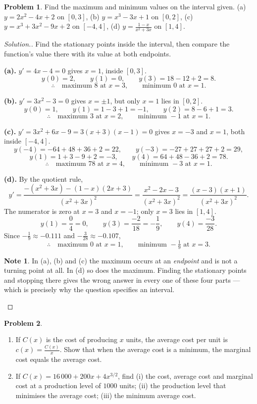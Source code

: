 \documentclass[11pt,a4paper]{article}
\theoremstyle{definition}
\newtheorem{note}[thm]{Note}
\newtheorem{problemx}{Problem}[section]
\newenvironment{problem}{\begin{problemx}}{\end{problemx}}
\newenvironment{solution}
  {\renewcommand{\qedsymbol}{}\begin{proof}[\textit{Solution}.]}
  {\end{proof}}
\begin{document}
\begin{problem}
Find the maximum and minimum values on the interval given.
\quad (a) $y=2x^2-4x+2$ on $[0,3]$, \quad (b) $y=x^3-3x+1$ on $[0,2]$, \quad
(c) $y=x^3+3x^2-9x+2$ on $[-4,4]$, \quad (d) $y=\frac{1-x}{x^2+3x}$ on $[1,4]$.
\end{problem}

\begin{solution}
Find the stationary points inside the interval, then compare the function's value there
with its value at both endpoints.

\textbf{(a).} $y'=4x-4=0$ gives $x=1$, inside $[0,3]$.
$$y(0)=2,\qquad y(1)=0,\qquad y(3)=18-12+2=8.$$
$$\therefore\quad \text{maximum } 8 \text{ at } x=3,\qquad
\text{minimum } 0 \text{ at } x=1.$$

\textbf{(b).} $y'=3x^2-3=0$ gives $x=\pm 1$, but only $x=1$ lies in $[0,2]$.
$$y(0)=1,\qquad y(1)=1-3+1=-1,\qquad y(2)=8-6+1=3.$$
$$\therefore\quad \text{maximum } 3 \text{ at } x=2,\qquad
\text{minimum } -1 \text{ at } x=1.$$

\textbf{(c).} $y'=3x^2+6x-9=3(x+3)(x-1)=0$ gives $x=-3$ and $x=1$, both inside
$[-4,4]$.
$$y(-4)=-64+48+36+2=22,\qquad y(-3)=-27+27+27+2=29,$$
$$y(1)=1+3-9+2=-3,\qquad y(4)=64+48-36+2=78.$$
$$\therefore\quad \text{maximum } 78 \text{ at } x=4,\qquad
\text{minimum } -3 \text{ at } x=1.$$

\textbf{(d).} By the quotient rule,
$$y'=\frac{-\left(x^2+3x\right)-(1-x)(2x+3)}{\left(x^2+3x\right)^2}
=\frac{x^2-2x-3}{\left(x^2+3x\right)^2}=\frac{(x-3)(x+1)}{\left(x^2+3x\right)^2}.$$
The numerator is zero at $x=3$ and $x=-1$; only $x=3$ lies in $[1,4]$.
$$y(1)=\frac{0}{4}=0,\qquad y(3)=\frac{-2}{18}=-\frac{1}{9},\qquad
y(4)=\frac{-3}{28}.$$
Since $-\frac{1}{9}\approx-0.111$ and $-\frac{3}{28}\approx-0.107$,
$$\therefore\quad \text{maximum } 0 \text{ at } x=1,\qquad
\text{minimum } -\tfrac{1}{9} \text{ at } x=3.$$

\begin{note}
In (a), (b) and (c) the maximum occurs at an \emph{endpoint} and is not a turning point
at all. In (d) so does the maximum. Finding the stationary points and stopping there
gives the wrong answer in every one of these four parts --- which is precisely why the
question specifies an interval.
\end{note}
\end{solution}

\begin{problem}
\begin{enumerate}
\item[(a).] If $C(x)$ is the cost of producing $x$ units, the average cost per unit is
$c(x)=\frac{C(x)}{x}$. Show that when the average cost is a minimum, the marginal cost
equals the average cost.
\item[(b).] If $C(x)=16\,000+200x+4x^{3/2}$, find
\quad (i) the cost, average cost and marginal cost at a production level of $1000$
units;
\quad (ii) the production level that minimises the average cost;
\quad (iii) the minimum average cost.
\end{enumerate}
\end{problem}
\end{document}
